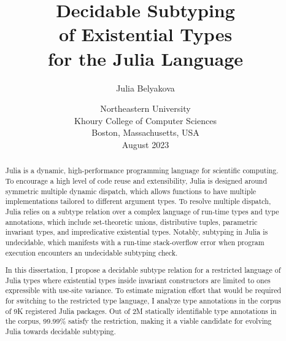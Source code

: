 \title{Decidable Subtyping\\ of Existential Types\\for the Julia Language}

\author{Julia Belyakova}

\date{\normalsize%
Northeastern University\\
Khoury College of Computer Sciences\\
Boston, Massachusetts, USA\\
August 2023
}

\maketitle


\begin{abstract}

Julia is a dynamic, high-performance programming language
for scientific computing.
To encourage a high level of code reuse and extensibility, Julia is
designed around symmetric multiple dynamic dispatch, which allows functions
to have multiple implementations tailored to different argument types.
To resolve multiple dispatch, Julia relies on a subtype relation over a complex
language of run-time types and type annotations, 
which include set-theoretic unions, distributive tuples, parametric invariant 
types, and impredicative existential types.
Notably, subtyping in Julia is undecidable, which
manifests with a run-time stack-overflow error when program execution encounters
an undecidable subtyping check.

In this dissertation, I propose a decidable subtype relation for a restricted
language of Julia types where existential types inside invariant constructors
are limited to ones expressible with use-site variance.
To estimate migration effort that would be required for switching to the 
restricted type language, I analyze type annotations in the corpus of 9K
registered Julia packages.
Out of 2M statically identifiable type annotations in the corpus,
99.99\% satisfy the restriction, making it a viable candidate for
evolving Julia towards decidable subtyping.

\end{abstract}
